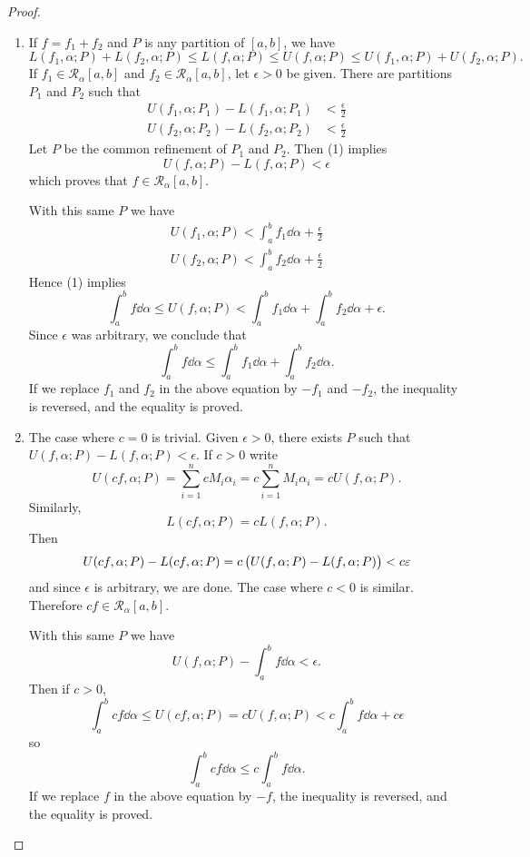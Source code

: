\begin{proof} \
\begin{enumerate}[label=(\roman*)]
\item If $f=f_1+f_2$ and $P$ is any partition of $[a,b]$, we have
\begin{equation*}\tag{1}
L(f_1,\alpha;P)+L(f_2,\alpha;P)\le L(f,\alpha;P)\le U(f,\alpha;P)\le U(f_1,\alpha;P)+U(f_2,\alpha;P).
\end{equation*}
If $f_1\in \mathcal{R}_\alpha[a,b]$ and $f_2\in \mathcal{R}_\alpha[a,b]$, let $\epsilon>0$ be given. There are partitions $P_1$ and $P_2$ such that
\begin{align*}
U(f_1,\alpha;P_1)-L(f_1,\alpha;P_1)&<\frac{\epsilon}{2}\\
U(f_2,\alpha;P_2)-L(f_2,\alpha;P_2)&<\frac{\epsilon}{2}
\end{align*}
Let $P$ be the common refinement of $P_1$ and $P_2$. Then (1) implies
\[U(f,\alpha;P)-L(f,\alpha;P)<\epsilon\]
which proves that $f\in\mathcal{R}_\alpha[a,b]$.

With this same $P$ we have
\begin{align*}
U(f_1,\alpha;P)<\int_{a}^{b}f_1\dd{\alpha}+\frac{\epsilon}{2}\\
U(f_2,\alpha;P)<\int_{a}^{b}f_2\dd{\alpha}+\frac{\epsilon}{2}
\end{align*}
Hence (1) implies
\[\int_{a}^{b}f\dd{\alpha}\le U(f,\alpha;P)<\int_{a}^{b}f_1\dd{\alpha}+\int_{a}^{b}f_2\dd{\alpha}+\epsilon.\]
Since $\epsilon$ was arbitrary, we conclude that
\[\int_{a}^{b}f\dd{\alpha}\le\int_{a}^{b}f_1\dd{\alpha}+\int_{a}^{b}f_2\dd{\alpha}.\]
If we replace $f_1$ and $f_2$ in the above equation by $-f_1$ and $-f_2$, the inequality is reversed, and the equality is proved.

\item The case where $c=0$ is trivial. Given $\epsilon>0$, there exists $P$ such that $U(f,\alpha;P)-L(f,\alpha;P)<\epsilon$. If $c>0$ write
\[U(cf,\alpha;P)=\sum_{i=1}^{n}cM_i\alpha_i=c\sum_{i=1}^{n}M_i\alpha_i=c U(f,\alpha;P).\]
Similarly,
\[L(cf,\alpha;P)=c L(f,\alpha;P).\]
Then
\[U(cf,\alpha;P)-L(cf,\alpha;P)=c\left(U(f,\alpha;P)-L(f,\alpha;P)\right)<c\varepsilon\]
and since $\epsilon$ is arbitrary, we are done. The case where $c<0$ is similar. Therefore $cf\in\mathcal{R}_\alpha[a,b]$.

With this same $P$ we have
\[U(f,\alpha;P)-\int_{a}^{b}f\dd{\alpha}<\epsilon.\]
Then if $c>0$,
\[\int_{a}^{b}cf\dd{\alpha}\le U(cf,\alpha;P)=cU(f,\alpha;P)<c\int_{a}^{b}f\dd{\alpha}+c\epsilon\]
so
\[\int_{a}^{b}cf\dd{\alpha}\le c\int_{a}^{b}f\dd{\alpha}.\]
If we replace $f$ in the above equation by $-f$, the inequality is reversed, and the equality is proved.


\end{enumerate}
\end{proof}

